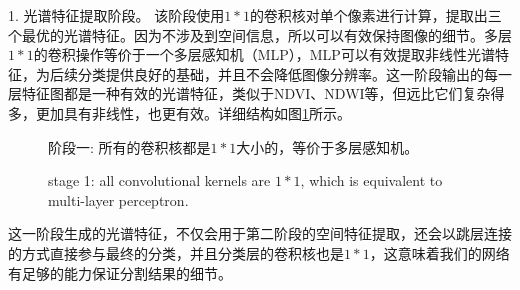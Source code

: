 \documentclass[10pt]{ctexart}
\begin{document}
\begin{multicols}{2} 
1. 光谱特征提取阶段。 该阶段使用$1*1$的卷积核对单个像素进行计算，提取出三个最优的光谱特征。因为不涉及到空间信息，所以可以有效保持图像的细节。多层$1*1$的卷积操作等价于一个多层感知机（MLP），MLP可以有效提取非线性光谱特征，为后续分类提供良好的基础，并且不会降低图像分辨率。这一阶段输出的每一层特征图都是一种有效的光谱特征，类似于NDVI、NDWI等，但远比它们复杂得多，更加具有非线性，也更有效。详细结构如图\ref{pic:straight}所示。

\begin{figure}[H]
    \centering
    \caption[]{阶段一: 所有的卷积核都是$1*1$大小的，等价于多层感知机。}
    \addtocounter{figure}{-1}
    \vspace{-5pt}
    \renewcommand{\figurename}{Fig}
    \caption{stage 1: all convolutional kernels are $1*1$, which is equivalent to multi-layer perceptron.}
    \renewcommand{\figurename}{图}
    \label{pic:straight}
\end{figure}

这一阶段生成的光谱特征，不仅会用于第二阶段的空间特征提取，还会以跳层连接的方式直接参与最终的分类，并且分类层的卷积核也是$1*1$，这意味着我们的网络有足够的能力保证分割结果的细节。


\end{multicols}
\end{document}
